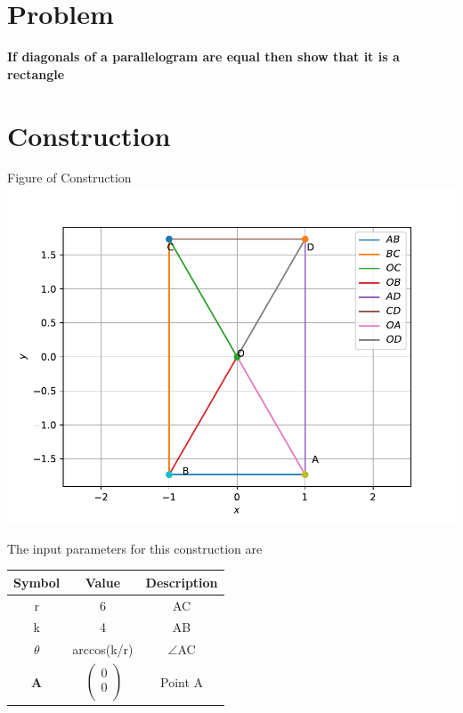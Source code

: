 \documentclass[10pt, a4paper]{article}
\begin{document}
\title{\mytitle}
\author{\myauthor\hspace{1em}\\\contact\\FWC22008\hspace{6.5em}IITH\hspace{0.5em}\mymodule\hspace{6em}ASSIGN-4}
\date{}
	\maketitle
		
	\tableofcontents
\vspace{5mm}
   \section{Problem}
\textbf{ If diagonals of a parallelogram are equal then show that it is a rectangle }
 \section{Construction}
 	\begin{center}
     Figure of Construction
     \includegraphics[scale=0.5]{fig.pdf} 
  	\end{center}
  	The input parameters for this construction are 
\begin{center}
\begin{tabular}{|c|c|c|}
	\hline
	\textbf{Symbol}&\textbf{Value}&\textbf{Description}\\
	\hline
	r&6&AC\\
	\hline
	k&4&AB\\ 
	\hline
	${\theta}$& arccos(k/r)&$ \angle $AC\\
	\hline
	\textbf{A}&$\
	\begin{pmatrix}
		0 \\
		0 \\
	\end{pmatrix}$
	&Point A\\
	\hline
	
\end{tabular}
\end{center}
\end{document}
